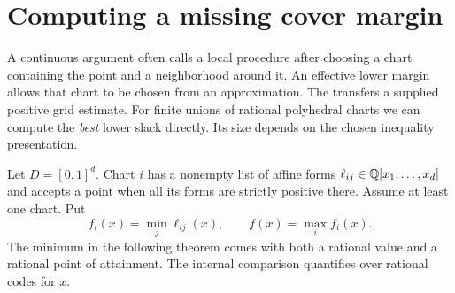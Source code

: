 \section{Computing a missing cover margin}
\label{sec:atlas}
A continuous argument often calls a local procedure after choosing a chart containing the point and a neighborhood around it. An effective lower margin allows that chart to be chosen from an approximation. The  transfers a supplied positive grid estimate. For finite unions of rational polyhedral charts we can compute the \emph{best} lower slack directly. Its size depends on the chosen inequality presentation.

Let $D=[0,1]^d$. Chart $i$ has a nonempty list of affine forms $\ell_{ij}\in\mathbb Q[x_1,\ldots,x_d]$ and accepts a point when all its forms are strictly positive there. Assume at least one chart. Put
\[
 f_i(x)=\min_j\ell_{ij}(x),\qquad f(x)=\max_i f_i(x).
\]
The minimum in the following theorem comes with both a rational value and a rational point of attainment. The internal comparison quantifies over rational codes for $x$.

